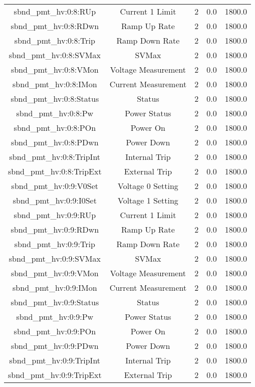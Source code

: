 \begin{center}
\begin{longtable}{c | c c c c }
sbnd\_pmt\_hv:0:8:RUp & Current 1 Limit & 2 & 0.0 & 1800.0\\ 
sbnd\_pmt\_hv:0:8:RDwn & Ramp Up Rate & 2 & 0.0 & 1800.0\\ 
sbnd\_pmt\_hv:0:8:Trip & Ramp Down Rate & 2 & 0.0 & 1800.0\\ 
sbnd\_pmt\_hv:0:8:SVMax & SVMax & 2 & 0.0 & 1800.0\\ 
sbnd\_pmt\_hv:0:8:VMon & Voltage Measurement & 2 & 0.0 & 1800.0\\ 
sbnd\_pmt\_hv:0:8:IMon & Current Measurement & 2 & 0.0 & 1800.0\\ 
sbnd\_pmt\_hv:0:8:Status & Status & 2 & 0.0 & 1800.0\\ 
sbnd\_pmt\_hv:0:8:Pw & Power Status & 2 & 0.0 & 1800.0\\ 
sbnd\_pmt\_hv:0:8:POn & Power On & 2 & 0.0 & 1800.0\\ 
sbnd\_pmt\_hv:0:8:PDwn & Power Down & 2 & 0.0 & 1800.0\\ 
sbnd\_pmt\_hv:0:8:TripInt & Internal Trip & 2 & 0.0 & 1800.0\\ 
sbnd\_pmt\_hv:0:8:TripExt & External Trip & 2 & 0.0 & 1800.0\\ 
sbnd\_pmt\_hv:0:9:V0Set & Voltage 0 Setting & 2 & 0.0 & 1800.0\\ 
sbnd\_pmt\_hv:0:9:I0Set & Voltage 1 Setting & 2 & 0.0 & 1800.0\\ 
sbnd\_pmt\_hv:0:9:RUp & Current 1 Limit & 2 & 0.0 & 1800.0\\ 
sbnd\_pmt\_hv:0:9:RDwn & Ramp Up Rate & 2 & 0.0 & 1800.0\\ 
sbnd\_pmt\_hv:0:9:Trip & Ramp Down Rate & 2 & 0.0 & 1800.0\\ 
sbnd\_pmt\_hv:0:9:SVMax & SVMax & 2 & 0.0 & 1800.0\\ 
sbnd\_pmt\_hv:0:9:VMon & Voltage Measurement & 2 & 0.0 & 1800.0\\ 
sbnd\_pmt\_hv:0:9:IMon & Current Measurement & 2 & 0.0 & 1800.0\\ 
sbnd\_pmt\_hv:0:9:Status & Status & 2 & 0.0 & 1800.0\\ 
sbnd\_pmt\_hv:0:9:Pw & Power Status & 2 & 0.0 & 1800.0\\ 
sbnd\_pmt\_hv:0:9:POn & Power On & 2 & 0.0 & 1800.0\\ 
sbnd\_pmt\_hv:0:9:PDwn & Power Down & 2 & 0.0 & 1800.0\\ 
sbnd\_pmt\_hv:0:9:TripInt & Internal Trip & 2 & 0.0 & 1800.0\\ 
sbnd\_pmt\_hv:0:9:TripExt & External Trip & 2 & 0.0 & 1800.0\\ 

\end{longtable}
\end{center}
